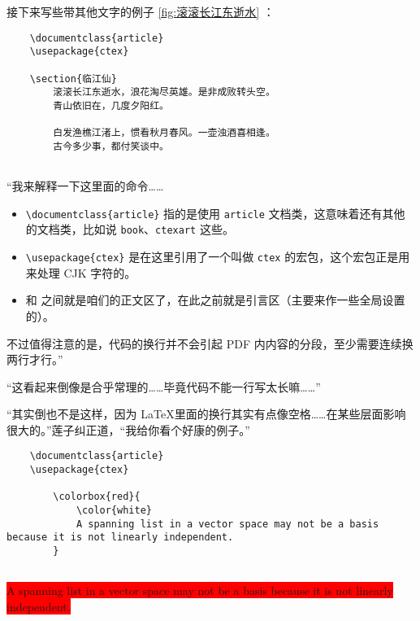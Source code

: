 接下来写些带其他文字的例子 \autoref{fig:滚滚长江东逝水} ：

\begin{lstlisting}
    \documentclass{article}
    \usepackage{ctex}
    
    \section{临江仙}
        滚滚长江东逝水，浪花淘尽英雄。是非成败转头空。
        青山依旧在，几度夕阳红。

        白发渔樵江渚上，惯看秋月春风。一壶浊酒喜相逢。
        古今多少事，都付笑谈中。    
    
\end{lstlisting}

“我来解释一下这里面的命令……

\begin{itemize}
    \item \verb"\documentclass{article}" 指的是使用 \verb"article" 文档类，这意味着还有其他的文档类，比如说 \verb"book"、\verb"ctexart" 这些。
    \item \verb"\usepackage{ctex}" 是在这里引用了一个叫做 \verb"ctex" 的宏包，这个宏包正是用来处理 CJK 字符的。
    \item \verb"" 和 \verb"" 之间就是咱们的正文区了，在此之前就是引言区（主要来作一些全局设置的）。
\end{itemize}

不过值得注意的是，代码的换行并不会引起 PDF 内内容的分段，至少需要连续换两行才行。”

“这看起来倒像是合乎常理的……毕竟代码不能一行写太长嘛……”

“其实倒也不是这样，因为 \LaTeX 里面的换行其实有点像空格……在某些层面影响很大的。”莲子纠正道，“我给你看个好康的例子。”

\begin{lstlisting}
    \documentclass{article}
    \usepackage{ctex}
    
        \colorbox{red}{
            \color{white} 
            A spanning list in a vector space may not be a basis because it is not linearly independent.
        }
    
\end{lstlisting}

\begin{center}\footnotesize
    \colorbox{red}{
        \color{white}
        A spanning list in a vector space may not be a basis because it is not linearly independent.
    }
\end{center}

